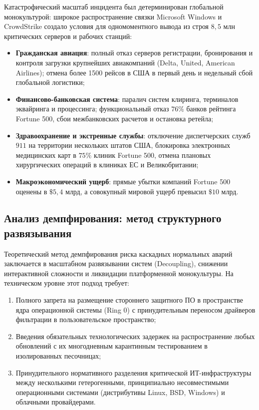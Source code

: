 \documentclass[12pt,a4paper]{article}
\begin{document}
Катастрофический масштаб инцидента был детерминирован глобальной 
монокультурой: широкое распространение связки Microsoft Windows и 
CrowdStrike создало условия для одномоментного вывода из строя 
$8{,}5\text{ млн}$ критических серверов и рабочих станций:
\begin{itemize}[leftmargin=1.5em, itemsep=0.2em]
    \item \textbf{Гражданская авиация}: полный отказ серверов 
    регистрации, бронирования и контроля загрузки крупнейших 
    авиакомпаний (Delta, United, American Airlines); отмена более 1500 
    рейсов в США в первый день и недельный сбой глобальной логистики;
    \item \textbf{Финансово-банковская система}: паралич систем 
    клиринга, терминалов эквайринга и процессинга; функциональный 
    отказ $76\%$ банков рейтинга Fortune 500, сбои межбанковских 
    расчетов и остановка ретейла;
    \item \textbf{Здравоохранение и экстренные службы}: отключение 
    диспетчерских служб $911$ на территории нескольких штатов США, 
    блокировка электронных медицинских карт в $75\%$ клиник Fortune 500, 
    отмена плановых хирургических операций в клиниках ЕС и 
    Великобритании;
    \item \textbf{Макроэкономический ущерб}: прямые убытки компаний 
    Fortune 500 оценены в $\$5{,}4\text{ млрд}$, а совокупный мировой 
    ущерб превысил $\$10\text{ млрд}$.
\end{itemize}

\subsection{Анализ демпфирования: метод структурного развязывания}

Теоретический метод демпфирования риска каскадных нормальных аварий 
заключается в масштабном развязывании систем (Decoupling), снижении 
интерактивной сложности и ликвидации платформенной монокультуры. На 
техническом уровне этот подход требует:
\begin{enumerate}[leftmargin=2em, itemsep=0.2em]
    \item Полного запрета на размещение стороннего защитного ПО в 
    пространстве ядра операционной системы (Ring $0$) с принудительным 
    переносом драйверов фильтрации в пользовательское пространство;
    \item Введения обязательных технологических задержек на 
    распространение любых обновлений с их многодневным карантинным 
    тестированием в изолированных песочницах;
    \item Принудительного нормативного разделения критической 
    ИТ-инфраструктуры между несколькими гетерогенными, принципиально 
    несовместимыми операционными системами (дистрибутивы Linux, BSD, 
    Windows) и облачными провайдерами.
\end{enumerate}
\end{document}
